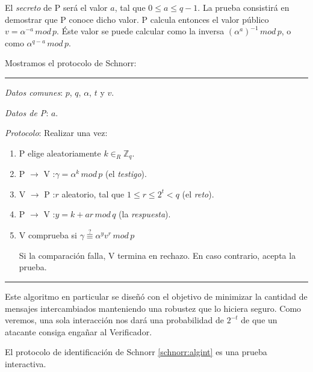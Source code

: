 El \textit{secreto} de P será el valor $a$, tal que $0\leq a \leq q-1$. La prueba consistirá en demostrar que P conoce dicho valor. P calcula entonces el valor público $v = \alpha ^{-a} \, mod \, p$. Éste valor se puede calcular como la inversa $\left( \alpha ^{a} \right) ^{-1} \, mod \, p$, o como $\alpha ^{q-a} \, mod \, p$.

Mostramos el protocolo de Schnorr:

\rule{\textwidth}{1pt}
\begin{algorithm}[Schnorr]\label{schnorr:algint}
	
	\hfil
	
	\textit{Datos comunes}: $p$, $q$, $\alpha$, $t$ y $v$.
	
	\textit{Datos de P}: $a$.
	
	\textit{Protocolo}: Realizar una vez:
	
	\begin{enumerate}
		
		\item P elige aleatoriamente $k \in_R \mathbb{Z}_q$.
		
		\item P $\rightarrow$ V :\quad $\gamma = \alpha^k \, mod \, p$ (el \textit{testigo}).
		
		\item V $\rightarrow$ P :\quad $r$ aleatorio, tal que $1\leq r\leq 2^t < q $ (el \textit{reto}).
		
		\item P $\rightarrow$ V :\quad $y = k + ar \, mod \, q$ (la \textit{respuesta}).
		
		\item V comprueba si $\gamma \overset{?}{\equiv} \alpha^y v^r \, mod \, p$
		
		Si la comparación falla, V termina en rechazo. En caso contrario, acepta la prueba.
		
		
	\end{enumerate}
	
\end{algorithm}
\rule{\textwidth}{1pt}

\hfil

Este algoritmo en particular se diseñó con el objetivo de minimizar la cantidad de mensajes intercambiados manteniendo una robustez que lo hiciera seguro. Como veremos, una sola interacción nos dará una probabilidad de $2^{-t}$ de que un atacante consiga engañar al Verificador.


\begin{theorem}
	El protocolo de identificación de Schnorr \ref{schnorr:algint} es una prueba interactiva.
\end{theorem}

